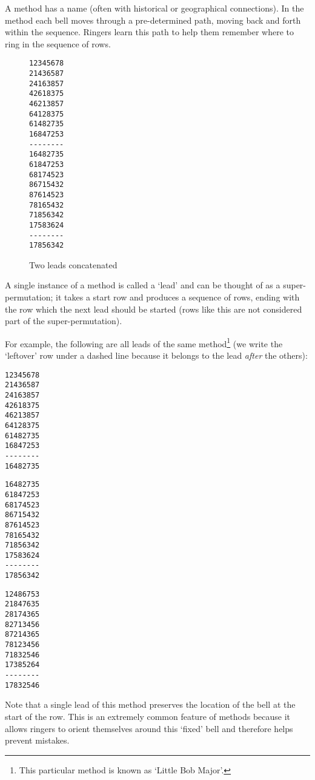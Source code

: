 \documentclass[12pt]{article}
\begin{document}
A method has a name (often with historical or geographical connections). In the method each bell
moves through a pre-determined path, moving back and forth within the sequence. Ringers learn this
path to help them remember where to ring in the sequence of rows.

\begin{wrapfigure}{r}{0.2\textwidth}
\centering
\begin{BVerbatim}
12345678
21436587
24163857
42618375
46213857
64128375
61482735
16847253
--------
16482735
61847253
68174523
86715432
87614523
78165432
71856342
17583624
--------
17856342
\end{BVerbatim}
\caption{Two leads concatenated}\label{fig:two-leads-lb8}
\end{wrapfigure}

A single instance of a method is called a `lead' and can be thought of as a super-permutation; it
takes a start row and produces a sequence of rows, ending with the row which the next lead should be
started (rows like this are not considered part of the super-permutation).

For example, the following are all leads of the same method\footnote{This particular method is known
as `Little Bob Major'.} (we write the `leftover' row under a dashed line because it belongs to the
lead \emph{after} the others):

\begin{multicols}{3}

\centering
\begin{BVerbatim}
12345678
21436587
24163857
42618375
46213857
64128375
61482735
16847253
--------
16482735
\end{BVerbatim}

\centering
\begin{BVerbatim}
16482735
61847253
68174523
86715432
87614523
78165432
71856342
17583624
--------
17856342
\end{BVerbatim}

\centering
\begin{BVerbatim}
12486753
21847635
28174365
82713456
87214365
78123456
71832546
17385264
--------
17832546
\end{BVerbatim}

\end{multicols}

Note that a single lead of this method preserves the location of the bell at the start of the
row.  This is an extremely common feature of methods because it allows ringers to orient
themselves around this `fixed' bell and therefore helps prevent mistakes.
\end{document}
